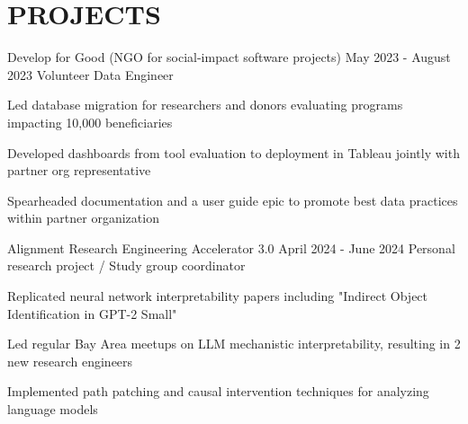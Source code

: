 \section{PROJECTS}
\begin{experience}
                   {Develop for Good \textnormal{(NGO for social-impact software projects)}}
                   {May 2023 - August 2023}
                   {Volunteer Data Engineer}
        \item Led database migration for researchers and donors evaluating programs impacting 10,000 beneficiaries
        \item Developed dashboards from tool evaluation to deployment in Tableau jointly with partner org representative
        \item Spearheaded documentation and a user guide epic to promote best data practices within partner organization 
\end{experience}

\vspace{0.1 cm}
\begin{experience}
                   {Alignment Research Engineering Accelerator 3.0}
                   {April 2024 - June 2024}
                   {Personal research project / Study group coordinator}
        \item Replicated neural network interpretability papers including "Indirect Object Identification in GPT-2 Small"
        \item Led regular Bay Area meetups on LLM mechanistic interpretability, resulting in 2 new research engineers
        \item Implemented path patching and causal intervention techniques for analyzing language models
\end{experience}
